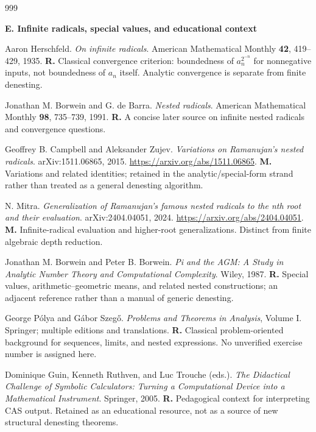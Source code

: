 \documentclass[11pt,a4paper]{article}
\let\sourceurl\url
\theoremstyle{definition}
\theoremstyle{remark}
\numberwithin{equation}{section}
\begin{document}
\begin{thebibliography}{999}
{\item[]\textbf{E. Infinite radicals, special values, and educational context}

Aaron Herschfeld.
\emph{On infinite radicals}.
American Mathematical Monthly \textbf{42}, 419--429, 1935.
\textbf{R.} Classical convergence criterion: boundedness of $a_n^{2^{-n}}$ for nonnegative inputs, not boundedness of $a_n$ itself. Analytic convergence is separate from finite denesting.

Jonathan M. Borwein and G. de Barra.
\emph{Nested radicals}.
American Mathematical Monthly \textbf{98}, 735--739, 1991.
\textbf{R.} A concise later source on infinite nested radicals and convergence questions.

Geoffrey B. Campbell and Aleksander Zujev.
\emph{Variations on Ramanujan's nested radicals}.
arXiv:1511.06865, 2015.
\sourceurl{https://arxiv.org/abs/1511.06865}.
\textbf{M.} Variations and related identities; retained in the analytic/special-form strand rather than treated as a general denesting algorithm.

N. Mitra.
\emph{Generalization of Ramanujan's famous nested radicals to the nth root and their evaluation}.
arXiv:2404.04051, 2024.
\sourceurl{https://arxiv.org/abs/2404.04051}.
\textbf{M.} Infinite-radical evaluation and higher-root generalizations. Distinct from finite algebraic depth reduction.

Jonathan M. Borwein and Peter B. Borwein.
\emph{Pi and the AGM: A Study in Analytic Number Theory and Computational Complexity}.
Wiley, 1987.
\textbf{R.} Special values, arithmetic--geometric means, and related nested constructions; an adjacent reference rather than a manual of generic denesting.

George P\'olya and G\'abor Szeg\H{o}.
\emph{Problems and Theorems in Analysis}, Volume I.
Springer; multiple editions and translations.
\textbf{R.} Classical problem-oriented background for sequences, limits, and nested expressions. No unverified exercise number is assigned here.

Dominique Guin, Kenneth Ruthven, and Luc Trouche (eds.).
\emph{The Didactical Challenge of Symbolic Calculators: Turning a Computational Device into a Mathematical Instrument}.
Springer, 2005.
\textbf{R.} Pedagogical context for interpreting CAS output. Retained as an educational resource, not as a source of new structural denesting theorems.

}
\end{thebibliography}
\end{document}
